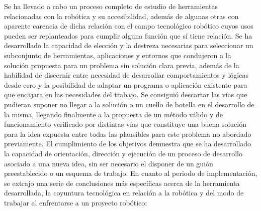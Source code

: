 Se ha llevado a cabo un proceso completo de estudio de herramientas relacionadas con la robótica y su accesibilidad, además de algunas otras con aparente carencia de dicha relación con el campo tecnológico robótico cuyos usos pueden ser replanteados para cumplir alguna función que sí tiene relación. Se ha desarrollado la capacidad de elección y la destreza necesarias para seleccionar un subconjunto de herramientas, aplicaciones y entornos que condujeron a la solución propuesta para un problema sin solución clara previa, además de la habilidad de discernir entre necesidad de desarrollar comportamientos y lógicas desde cero y la posibilidad de adaptar un programa o aplicación existente para que encajara en las necesidades del trabajo. Se consiguió descartar las vías que pudieran suponer no llegar a la solución o un cuello de botella en el desarrollo de la misma, llegando finalmente a la propuesta de un método válido y de funcionamiento verificado por distintas vías que constituye una buena solución para la idea expuesta entre todas las plausibles para este problema no abordado previamente. El cumplimiento de los objetivos demuestra que se ha desarrollado la capacidad de orientación, dirección y ejecución de un proceso de desarrollo asociado a una nueva idea, sin ser necesario el disponer de un guión preestablecido o un esquema de trabajo.
En cuanto al periodo de implementación, se extrajo una serie de conclusiones más específicas acerca de la herramienta desarrollada, la coyuntura tecnológica en relación a la robótica y del modo de trabajar al enfrentarse a un proyecto robótico:
